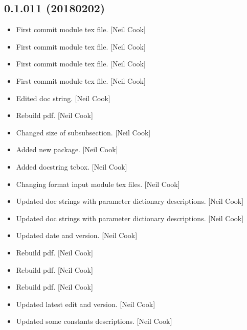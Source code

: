 \documentclass[a4paper,10pt,english]{report}
\begin{document}
\subsection{0.1.011 (2018\sphinxhyphen{}02\sphinxhyphen{}02)}
\label{\detokenize{misc/changelog:id512}}\begin{itemize}
\item {} 
First commit \sphinxhyphen{} module tex file. {[}Neil Cook{]}

\item {} 
First commit \sphinxhyphen{} module tex file. {[}Neil Cook{]}

\item {} 
First commit \sphinxhyphen{} module tex file. {[}Neil Cook{]}

\item {} 
First commit \sphinxhyphen{} module tex file. {[}Neil Cook{]}

\item {} 
Edited doc string. {[}Neil Cook{]}

\item {} 
Rebuild pdf. {[}Neil Cook{]}

\item {} 
Changed size of subsubsection. {[}Neil Cook{]}

\item {} 
Added new package. {[}Neil Cook{]}

\item {} 
Added docstring tcbox. {[}Neil Cook{]}

\item {} 
Changing format input module tex files. {[}Neil Cook{]}

\item {} 
Updated doc strings with parameter dictionary descriptions. {[}Neil
Cook{]}

\item {} 
Updated doc strings with parameter dictionary descriptions. {[}Neil
Cook{]}

\item {} 
Updated date and version. {[}Neil Cook{]}

\item {} 
Rebuild pdf. {[}Neil Cook{]}

\item {} 
Rebuild pdf. {[}Neil Cook{]}

\item {} 
Rebuild pdf. {[}Neil Cook{]}

\item {} 
Updated latest edit and version. {[}Neil Cook{]}

\item {} 
Updated some constants descriptions. {[}Neil Cook{]}

\end{itemize}
\end{document}
